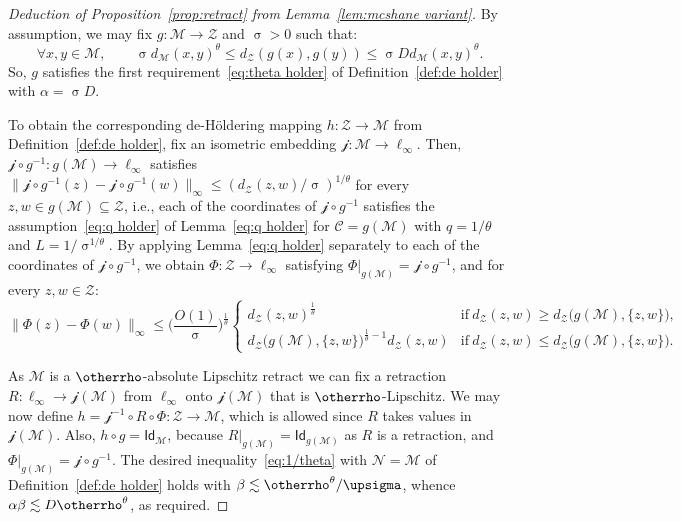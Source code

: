 \documentclass[11pt,reqno]{amsart}
\renewcommand{\le}{\leqslant}
\renewcommand{\ge}{\geqslant}
\renewcommand{\subset}{\subseteq}
\newcommand{\cZ}{\mathcal{Z}}
\newcommand{\Id}{\mathsf{Id}}
\newcommand{\cj}{\mathcal{j}}
\newcommand{\NN}{\mathcal{N}}
\newcommand{\MM}{\mathcal{M}}
\newcommand{\sub}{\mathscr{C}}
\renewcommand{\r}{\otherrho}
\begin{document}
\begin{proof}[Deduction of Proposition~\ref{prop:retract} from Lemma~\ref{lem:mcshane variant}] By assumption, we may fix  $g:\MM\to \cZ$ and $\upsigma>0$ such that: 
$$\forall x,y\in \MM,\qquad \upsigma d_\MM(x,y)^\theta\le d_\cZ(g(x),g(y))\le \upsigma Dd_\MM(x,y)^\theta.$$ 
So, $g$ satisfies the first requirement~\eqref{eq:theta holder} of Definition~\ref{def:de holder} with $\alpha=\upsigma D$. 

To obtain the corresponding de-H\"oldering mapping $h:\cZ\to \MM$ from Definition~\ref{def:de holder}, fix an isometric embedding $\cj:\MM\to \ell_\infty$. Then, $\cj\circ g^{-1}:g(\MM)\to \ell_\infty$ satisfies $\|\mathcal{j}\circ g^{-1}(z)-\mathcal{j}\circ g^{-1} (w)\|_\infty\le (d_\cZ(z,w)/\upsigma)^{1/\theta}$ for every $z,w\in g(\MM)\subset \cZ$, i.e., each of the coordinates of $\mathcal{j}\circ g^{-1}$ satisfies the assumption~\eqref{eq:q holder} of Lemma~\ref{eq:q holder}  for $\sub=g(\MM)$ with $q=1/\theta$ and $L=1/\upsigma^{1/\theta}$. By applying Lemma~\ref{eq:q holder} separately to each of the  coordinates of $\mathcal{j}\circ g^{-1}$, we obtain  $\Phi: \cZ\to \ell_\infty$ satisfying $\Phi|_{g(\MM)}=\cj\circ g^{-1}$, and for every $z,w\in \cZ$: 
$$
 \|\Phi(z)-\Phi(w)\|_\infty \le \Big(\frac{O(1)}{\upsigma}\Big)^{\frac{1}{\theta}} \left\{\begin{array}{ll} d_\cZ(z,w)^{\frac{1}{\theta}} &\mathrm{if\ } d_\cZ(z,w)\ge d_\cZ\big(g(\MM),\{z,w\}\big),\\ d_\cZ\big(g(\MM),\{z,w\}\big)^{\frac{1}{\theta}-1}d_\cZ(z,w)&\mathrm{if\ }d_\cZ(z,w)\le d_\cZ\big(g(\MM),\{z,w\}\big).  \end{array}\right.
$$

As $\MM$ is a $\r$-absolute Lipschitz retract we can fix a retraction $R:\ell_\infty \to \cj(\MM)$ from $\ell_\infty$ onto $\cj(\MM)$ that is $\r$-Lipschitz. We may now define $h= \cj^{-1}\circ R\circ \Phi:\cZ\to \MM$, which is allowed since $R$ takes values in $\cj(\MM)$. Also,  $h\circ g=\Id_\MM$, because $R|_{g(\MM)}=\Id_{g(\MM)}$    as $R$ is a retraction, and $\Phi|_{g(\MM)}=\cj\circ g^{-1}$. The desired inequality~\eqref{eq:1/theta} with $\NN=\MM$ of  Definition~\ref{def:de holder} holds with $\beta\lesssim \r^\theta/\upsigma$, whence $\alpha\beta\lesssim  D\r^\theta$, as required. 
\end{proof}
\end{document}

